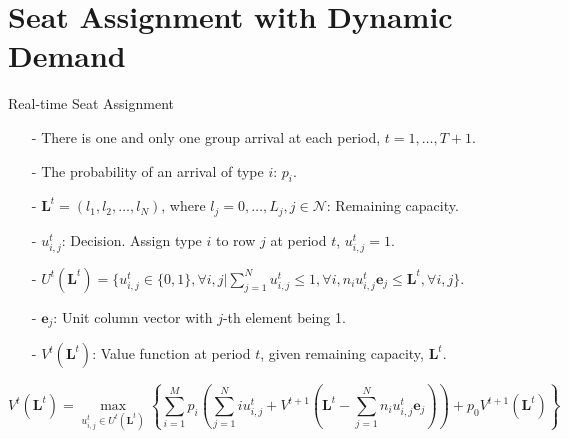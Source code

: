
\section{Seat Assignment with Dynamic Demand}
    \frame{\sectionpage}

    \begin{frame}{Real-time Seat Assignment}
      \centering
      \small
      \begin{itemize}
      \item[-] There is one and only one group arrival at each period, $t = 1, \ldots, T+1$. 
      \item[-] The probability of an arrival of type $i$: $p_i$.
      \item[-] $\mathbf{L}^{t} = (l_1, l_2, \ldots, l_{N})$, where $l_j =0,\ldots, L_j, j\in \mathcal{N}$: Remaining capacity.
      \item[-] $u_{i,j}^{t}$: Decision. Assign type $i$ to row $j$ at period $t$, $u_{i,j}^t =1$.
      \item[-] $U^{t}(\mathbf{L}^{t}) = \{u_{i,j}^{t} \in\{0,1\}, \forall i,j| \sum_{j=1}^{N} u_{i,j}^{t} \leq 1, \forall i, n_{i}u_{i,j}^{t}\mathbf{e}_j \leq \mathbf{L}^{t}, \forall i,j \}$.
      \item[-] $\mathbf{e}_j$: Unit column vector with $j$-th element being 1.
      \item[-] $V^{t}(\mathbf{L}^{t})$: Value function at period $t$, given remaining capacity, $\mathbf{L}^{t}$.
      \end{itemize}
  
      $$V^{t}(\mathbf{L}^{t}) = \max_{u_{i,j}^{t} \in U^{t}(\mathbf{L}^{t})}\left\{ \sum_{i=1}^{M} p_i ( \sum_{j=1}^{N} i u_{i,j}^{t} + V^{t+1}(\mathbf{L}^{t}- \sum_{j=1}^{N} n_i u_{i,j}^{t}\mathbf{e}_j)) + p_0 V^{t+1}(\mathbf{L}^{t})\right\}$$
      \small
  \end{frame}

